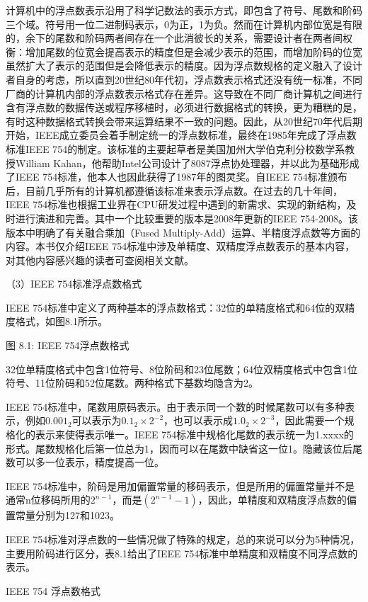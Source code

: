 \documentclass[]{ctexbook}
\begin{document}
计算机中的浮点数表示沿用了科学记数法的表示方式，即包含了符号、尾数和阶码三个域。符号用一位二进制码表示，0为正，1为负。然而在计算机内部位宽是有限的，余下的尾数和阶码两者间存在一个此消彼长的关系，需要设计者在两者间权衡：增加尾数的位宽会提高表示的精度但是会减少表示的范围，而增加阶码的位宽虽然扩大了表示的范围但是会降低表示的精度。因为浮点数规格的定义融入了设计者自身的考虑，所以直到20世纪80年代初，浮点数表示格式还没有统一标准，不同厂商的计算机内部的浮点数表示格式存在差异。这导致在不同厂商计算机之间进行含有浮点数的数据传送或程序移植时，必须进行数据格式的转换，更为糟糕的是，有时这种数据格式转换会带来运算结果不一致的问题。因此，从20世纪70年代后期开始，IEEE成立委员会着手制定统一的浮点数标准，最终在1985年完成了浮点数标准IEEE 754的制定。该标准的主要起草者是美国加州大学伯克利分校数学系教授William Kahan，他帮助Intel公司设计了8087浮点协处理器，并以此为基础形成了IEEE 754标准，他本人也因此获得了1987年的图灵奖。自IEEE 754标准颁布后，目前几乎所有的计算机都遵循该标准来表示浮点数。在过去的几十年间，IEEE 754标准也根据工业界在CPU研发过程中遇到的新需求、实现的新结构，及时进行演进和完善。其中一个比较重要的版本是2008年更新的IEEE 754-2008。该版本中明确了有关融合乘加（Fused Multiply-Add）运算、半精度浮点数等方面的内容。本书仅介绍IEEE 754标准中涉及单精度、双精度浮点数表示的基本内容，对其他内容感兴趣的读者可查阅相关文献。

（3）IEEE 754标准浮点数格式

IEEE 754标准中定义了两种基本的浮点数格式：32位的单精度格式和64位的双精度格式，如图8.1所示。

图 8.1: IEEE 754浮点数格式

32位单精度格式中包含1位符号、8位阶码和23位尾数；64位双精度格式中包含1位符号、11位阶码和52位尾数。两种格式下基数均隐含为2。

IEEE 754标准中，尾数用原码表示。由于表示同一个数的时候尾数可以有多种表示，例如\(0.001_{2}\)可以表示为\(0.1_{2}\times 2^{-2}\)，也可以表示成\(1.0_{2}\times 2^{-3}\)，因此需要一个规格化的表示来使得表示唯一。IEEE 754标准中规格化尾数的表示统一为1.xxxx的形式。尾数规格化后第一位总为1，因而可以在尾数中缺省这一位1。隐藏该位后尾数可以多一位表示，精度提高一位。

IEEE 754标准中，阶码是用加偏置常量的移码表示，但是所用的偏置常量并不是通常n位移码所用的\(2^{n-1}\)，而是\((2^{n-1}-1)\)，因此，单精度和双精度浮点数的偏置常量分别为127和1023。

IEEE 754标准对浮点数的一些情况做了特殊的规定，总的来说可以分为5种情况，主要用阶码进行区分，表8.1给出了IEEE 754标准中单精度和双精度不同浮点数的表示。

\label{tab:tabIEEE754float}IEEE 754 浮点数格式
\end{document}
